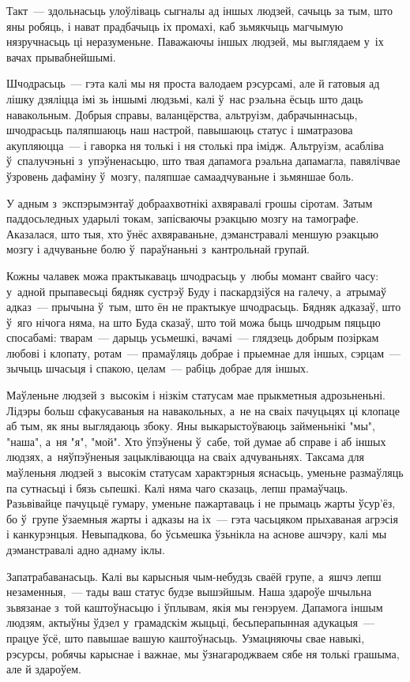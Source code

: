 Такт~--- здольнасьць улоўліваць сыгналы ад іншых людзей, сачыць за тым, што яны робяць, і нават прадбачыць іх промахі, каб зьмякчыць магчымую нязручнасьць ці неразуменьне. Паважаючы іншых людзей, мы выглядаем у~іх вачах прывабнейшымі.

Шчодрасьць~--- гэта калі мы ня проста валодаем рэсурсамі, але й гатовыя ад лішку дзяліцца імі зь іншымі людзьмі, калі ў~нас рэальна ёсьць што даць навакольным. Добрыя справы, валанцёрства, альтруізм, дабрачыннасьць, шчодрасьць паляпшаюць наш настрой, павышаюць статус і шматразова акупляюцца~--- і гаворка ня толькі і ня столькі пра імідж. Альтруізм, асабліва ў~спалучэньні з~упэўненасьцю, што твая дапамога рэальна дапамагла, павялічвае ўзровень дафаміну ў~мозгу, паляпшае самаадчуваньне і зьмяншае боль.

У адным з~экспэрымэнтаў добраахвотнікі ахвяравалі грошы сіротам. Затым паддосьледных ударылі токам, запісваючы рэакцыю мозгу на тамографе. Аказалася, што тыя, хто ўнёс ахвяраваньне, дэманстравалі меншую рэакцыю мозгу і адчуваньне болю ў~параўнаньні з~кантрольнай групай.

Кожны чалавек можа практыкаваць шчодрасьць у~любы момант свайго часу: у~адной прыпавесьці бядняк сустрэў Буду і паскардзіўся на галечу, а~атрымаў адказ~--- прычына ў~тым, што ён не практыкуе шчодрасьць. Бядняк адказаў, што ў~яго нічога няма, на што Буда сказаў, што той можа быць шчодрым пяцьцю спосабамі: тварам~--- дарыць усьмешкі, вачамі~--- глядзець добрым позіркам любові і клопату, ротам~--- прамаўляць добрае і прыемнае для іншых, сэрцам~--- зычыць шчасьця і спакою, целам~--- рабіць добрае для іншых.

Маўленьне людзей з~высокім і нізкім статусам мае прыкметныя адрозьненьні. Лідэры больш сфакусаваныя на навакольных, а~не на сваіх пачуцьцях ці клопаце аб тым, як яны выглядаюць збоку. Яны выкарыстоўваюць займеньнікі "мы", "наша", а~ня "я", "мой". Хто ўпэўнены ў~сабе, той думае аб справе і аб іншых людзях, а~няўпэўненыя зацыкліваюцца на сваіх адчуваньнях. Таксама для маўленьня людзей з~высокім статусам характэрныя яснасьць, уменьне размаўляць па сутнасьці і бязь сьпешкі. Калі няма чаго сказаць, лепш прамаўчаць. Разьвівайце пачуцьцё гумару, уменьне пажартаваць і не прымаць жарты ўсур'ёз, бо ў~групе ўзаемныя жарты і адказы на іх~--- гэта часьцяком прыхаваная агрэсія і канкурэнцыя. Невыпадкова, бо ўсьмешка ўзьнікла на аснове ашчэру, калі мы дэманстравалі адно аднаму іклы.

Запатрабаванасьць. Калі вы карысныя чым-небудзь сваёй групе, а~яшчэ лепш незаменныя,~--- тады ваш статус будзе вышэйшым. Наша здароўе шчыльна зьвязанае з~той каштоўнасьцю і ўплывам, якія мы генэруем. Дапамога іншым людзям, актыўны ўдзел у~грамадскім жыцьці, бесьперапынная адукацыя~--- працуе ўсё, што павышае вашую каштоўнасьць. Узмацняючы свае навыкі, рэсурсы, робячы карыснае і важнае, мы ўзнагароджваем сябе ня толькі грашыма, але й здароўем.


